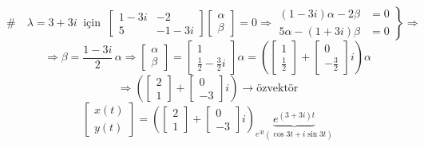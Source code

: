 \documentclass[11pt,a4paper]{article}
\begin{document}
\begin{cozum}
\[
\# \quad \lambda = 3+3i \ \text{ için } \ \begin{bmatrix} 1-3i & -2 \\ 5 & -1-3i \end{bmatrix}\begin{bmatrix} \alpha \\ \beta \end{bmatrix} = 0 \Rightarrow \left.\begin{aligned} (1-3i)\alpha - 2\beta &= 0 \\ 5\alpha - (1+3i)\beta &= 0 \end{aligned}\right\} \Rightarrow
\]
\[
\Rightarrow \beta = \frac{1-3i}{2}\,\alpha \Rightarrow \begin{bmatrix} \alpha \\ \beta \end{bmatrix} = \begin{bmatrix} 1 \\ \frac12 - \frac32 i \end{bmatrix}\alpha = \left(\begin{bmatrix} 1 \\ \frac12 \end{bmatrix} + \begin{bmatrix} 0 \\ -\frac32 \end{bmatrix}i\right)\alpha
\]
\[
\Rightarrow \left(\begin{bmatrix} 2 \\ 1 \end{bmatrix} + \begin{bmatrix} 0 \\ -3 \end{bmatrix}i\right) \rightarrow \text{özvektör}
\]
\[
\begin{bmatrix} x(t) \\ y(t) \end{bmatrix} = \left(\begin{bmatrix} 2 \\ 1 \end{bmatrix} + \begin{bmatrix} 0 \\ -3 \end{bmatrix}i\right)\underbrace{e^{(3+3i)t}}_{e^{3t}(\cos 3t + i\sin 3t)}
\]
\[
\]
\end{cozum}
\end{document}
